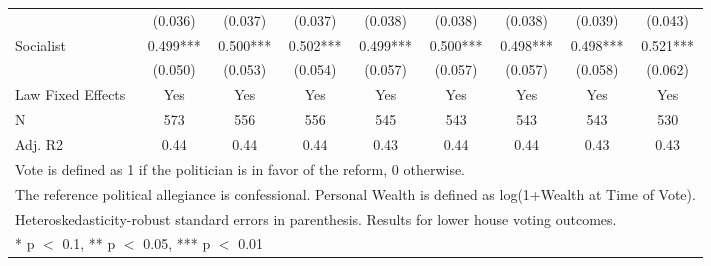 \begin{table}
\begin{tabular}[t]{lcccccccc}
 & (\num{0.036}) & (\num{0.037}) & (\num{0.037}) & (\num{0.038}) & (\num{0.038}) & (\num{0.038}) & (\num{0.039}) & (\num{0.043})\\
Socialist & \num{0.499}*** & \num{0.500}*** & \num{0.502}*** & \num{0.499}*** & \num{0.500}*** & \num{0.498}*** & \num{0.498}*** & \num{0.521}***\\
 & (\num{0.050}) & (\num{0.053}) & (\num{0.054}) & (\num{0.057}) & (\num{0.057}) & (\num{0.057}) & (\num{0.058}) & (\num{0.062})\\
\midrule
Law Fixed Effects & Yes & Yes & Yes & Yes & Yes & Yes & Yes & Yes\\
N & \num{573} & \num{556} & \num{556} & \num{545} & \num{543} & \num{543} & \num{543} & \num{530}\\
Adj. R2 & \num{0.44} & \num{0.44} & \num{0.44} & \num{0.43} & \num{0.44} & \num{0.44} & \num{0.43} & \num{0.43}\\
\bottomrule
\multicolumn{9}{l}{\rule{0pt}{1em}Vote is defined as 1 if the politician is in favor of the reform, 0 otherwise.}\\
\multicolumn{9}{l}{\rule{0pt}{1em}The reference political allegiance is confessional. Personal Wealth is defined as log(1+Wealth at Time of Vote).}\\
\multicolumn{9}{l}{\rule{0pt}{1em}Heteroskedasticity-robust standard errors in parenthesis. Results for lower house voting outcomes.}\\
\multicolumn{9}{l}{\rule{0pt}{1em}* p $<$ 0.1, ** p $<$ 0.05, *** p $<$ 0.01}\\
\end{tabular}
\end{table}
